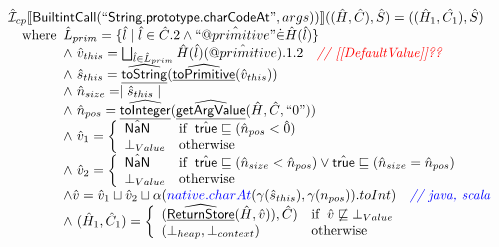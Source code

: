 \[\begin{array}{l}
\hat{\mathcal{I}} _{cp}\llbracket \mbox{\textsf{BuiltintCall}}(``\mbox{\textsf{String.prototype.charCodeAt}}",args))\rrbracket((\hat{H},\hat{C}), \hat{S})
  = ((\hat{H}_1, \hat{C_1}), \hat{S})\\
\quad{\rm where}\begin{array}[t]{l}     
  \hat{L}_{prim} = \{ \hat{l} \mid \hat{l} \in \hat{C}.2 \land ``\hat{@primitive}" \dot{\in}\hat{H}(\hat{l}) \}\\
  \land\ \hat{v}_{this} = \bigsqcup_{\hat{l} \in \hat{L}_{prim}} \hat{H}(\hat{l})(\hat{@primitive}).1.2
    \quad\textit{{\color{red}// [[DefaultValue]]??}}\\
  \land\ \hat{s}_{this} = \widehat{\underline{\sf toString}}(\widehat{\underline{\sf toPrimitive}}(\hat{v}_{this}))\\
  \land\ \hat{n}_{size} = \mid \hat{s}_{this} \mid\\
  \land\ \hat{n}_{pos} = \widehat{\underline{\sf toInteger}}(\widehat{\underline{\sf getArgValue}}(\hat{H}, \hat{C}, ``0"))\\
  \land\ \hat{v}_1 =  \left\{\begin{array}{ll}
      \hat{\mbox{\textsf{NaN}}} & {\rm if}\begin{array}[t]{l}\hat{\mbox{\textsf{true}}} \sqsubseteq (\hat{n}_{pos} < \hat{0})\end{array}\\
      \bot_{Value} & {\rm otherwise}\\
    \end{array}\right.\\
  \land\ \hat{v}_2 =  \left\{\begin{array}{ll}
      \hat{\mbox{\textsf{NaN}}}
      & {\rm if}\begin{array}[t]{l}\hat{\mbox{\textsf{true}}} \sqsubseteq (\hat{n}_{size} < \hat{n}_{pos}) 
        \lor \hat{\mbox{\textsf{true}}} \sqsubseteq (\hat{n}_{size} = \hat{n}_{pos}) \end{array}\\
      \bot_{Value} & {\rm otherwise}\\
    \end{array}\right.\\
  \land \hat{v} = \hat{v}_1 \sqcup \hat{v}_2 \sqcup \alpha({\color{blue} native.charAt}(\gamma(\hat{s}_{this}),\gamma(n_{pos})).toInt)\quad\textit{{\color{blue}// java, scala}}\\  
  \land\ (\hat{H}_1, \hat{C}_1) = 
    \left\{\begin{array}{ll}
      (\widehat{\underline{\sf ReturnStore}}(\hat{H}, \hat{v})), \hat{C})
      & {\rm if}\begin{array}[t]{l}\hat{v} \not\sqsubseteq \bot_{Value}\end{array}\\
      (\bot_{heap}, \bot_{context}) & {\rm otherwise} \\
    \end{array}\right.\\
  \end{array}\\
\\\\


\end{array}
\]
